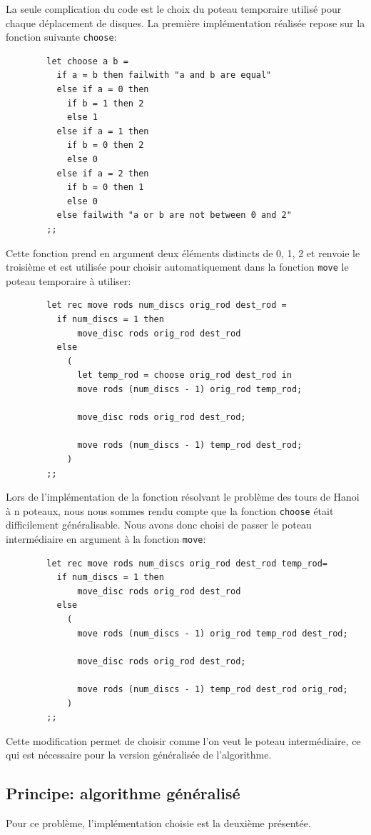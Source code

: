 \documentclass[a4paper, 11pt]{article}%
\begin{document}
		La seule complication du code est le choix du poteau temporaire utilisé
		pour chaque déplacement de disques. La première implémentation réalisée
		repose sur la fonction suivante \texttt{choose}:

		\begin{lstlisting}
		let choose a b =
		  if a = b then failwith "a and b are equal"
		  else if a = 0 then
			if b = 1 then 2
			else 1
		  else if a = 1 then
			if b = 0 then 2
			else 0
		  else if a = 2 then
			if b = 0 then 1
			else 0
		  else failwith "a or b are not between 0 and 2"
		;;
		\end{lstlisting}

		Cette fonction prend en argument deux éléments distincts de {0, 1, 2} et
		renvoie le troisième et est utilisée pour choisir automatiquement dans
		la fonction \texttt{move} le poteau temporaire à utiliser:

		\begin{lstlisting}
		let rec move rods num_discs orig_rod dest_rod =
		  if num_discs = 1 then
			  move_disc rods orig_rod dest_rod
		  else
			(
			  let temp_rod = choose orig_rod dest_rod in
			  move rods (num_discs - 1) orig_rod temp_rod;
			  
			  move_disc rods orig_rod dest_rod;
			  
			  move rods (num_discs - 1) temp_rod dest_rod;
			)
		;;
		\end{lstlisting}

		Lors de l'implémentation de la fonction résolvant le problème des tours
		de Hanoi à n poteaux, nous nous sommes rendu compte que la fonction
		\texttt{choose} était difficilement généralisable. Nous avons donc choisi
		de passer le poteau intermédiaire en argument à la fonction \texttt{move}:

		\begin{lstlisting}
		let rec move rods num_discs orig_rod dest_rod temp_rod=
		  if num_discs = 1 then
			  move_disc rods orig_rod dest_rod
		  else
			(
			  move rods (num_discs - 1) orig_rod temp_rod dest_rod;
			  
			  move_disc rods orig_rod dest_rod;
			  
			  move rods (num_discs - 1) temp_rod dest_rod orig_rod;
			)
		;;
		\end{lstlisting}

		Cette modification permet de choisir comme l'on veut le poteau intermédiaire,
		ce qui est nécessaire pour la version généralisée de l'algorithme.
	
	\subsection{Principe: algorithme généralisé}
		Pour ce problème, l'implémentation choisie est la deuxième présentée.
		
\end{document}

